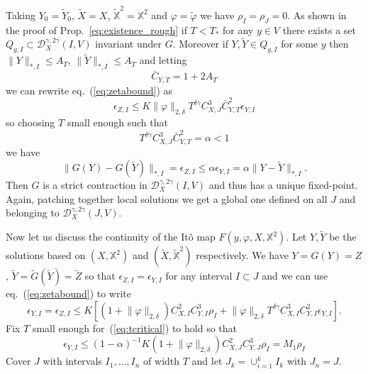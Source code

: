 \documentclass[a4paper,12pt,reqno]{amsproc}
\newcommand{\DD}{\mathcal{D}}
\newcommand{\norm}[1]{\lVert #1\rVert}
\newcommand{\wt}{\widetilde}
\begin{document}
Taking $Y_0 = \wt Y_0$, $\wt X = X$, $\mathbb{\wt X}^2 =
\mathbb{X}^2$ and $\varphi = \wt \varphi$ we have $\rho_I = \rho_J
= 0$. As shown in the proof of Prop.~\ref{eq:existence_rough} if $T < T_*$  for any $y \in V$ there exists a set
$Q_{y,I} \subset \DD_{X}^{\gamma,2\gamma}(I,V)$ invariant under $G$.
Moreover if  $Y,\wt Y \in Q_{y,I}$ for some $y$ then
$\norm{Y}_{*,I} \le A_T$, $\norm{\wt Y}_{*,I} \le A_T$ and
letting
$$
\bar C_{Y,T} = 1+2 A_T
$$
we can rewrite eq.~(\ref{eq:zetabound}) as
$$
  \epsilon_{Z,I} \le K  \norm{\varphi}_{2,\delta} T^{\delta\gamma}
  C_{X,J}^3 \bar C_{Y,T}^2 \epsilon_{Y,I}
$$
so choosing $ T$ small enough such that 
\begin{equation}
  \label{eq:tcritical}
  T^{\delta\gamma}
C_{X,J}^3 \bar C_{Y,T}^2 = \alpha < 1 
\end{equation}
we have 
$$
\|G(Y)-G(\wt Y)\|_{*,I} = \epsilon_{Z,I} \le \alpha \epsilon_{Y,I} =
\alpha  \|Y-\wt Y\|_{*,I}.
$$
Then $G$ is a strict contraction in $\DD_X^{\gamma,2\gamma}(I,V)$ and
thus has a unique fixed-point. Again, patching together local solutions we
get a global one defined on all $J$ and belonging to
$\DD_X^{\gamma,2\gamma}(J,V)$.

Now let us discuss the continuity of the It\^o map
$F(y,\varphi,X,\mathbb{X}^2)$.  Let $Y, \wt Y$ be the solutions based
on $(X,\mathbb{X}^2)$ and $(\wt X,\mathbb{\wt X}^2)$ respectively. We have $Y
= G(Y) = Z$, $\wt Y
= \wt G(\wt Y) = \wt Z$ so that $\epsilon_{Z,I} = \epsilon_{Y,I}$ for any
interval $I \subset J$ and we   can use
eq.~(\ref{eq:zetabound}) to write
$$
\epsilon_{Y,I} = \epsilon_{Z,I} \le
K  [(1+\norm{\varphi}_{2,\delta})C_{X,I}^2 C_{Y,I}^3 \rho_I + \norm{\varphi}_{2,\delta}T^{\delta\gamma}
C_{X,I}^3 C_{Y,I}^2 \epsilon_{Y,I}].
$$
Fix $T$ small enough for~(\ref{eq:tcritical}) to hold so that
$$
\epsilon_{Y,I} \le (1-\alpha)^{-1} K  (1+\norm{\varphi}_{2,\delta})
C_{X,J}^2 C_{Y,J}^3 \rho_I = M_1 \rho_I
$$
Cover $J$ with intervals $I_1,\dots,I_n$ of width $T$ and let $J_k =
\cup_{i=1}^k I_k$ with $J_n = J$.
\end{document}

